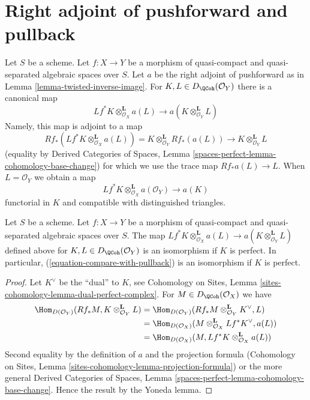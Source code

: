 \section{Right adjoint of pushforward and pullback}
\label{section-compare-with-pullback}

\noindent
Let $S$ be a scheme.
Let $f : X \to Y$ be a morphism of quasi-compact and quasi-separated
algebraic spaces over $S$.
Let $a$ be the right adjoint of pushforward as in
Lemma \ref{lemma-twisted-inverse-image}. For $K, L \in D_\QCoh(\mathcal{O}_Y)$
there is a canonical map
$$
Lf^*K \otimes^\mathbf{L}_{\mathcal{O}_X} a(L)
\longrightarrow
a(K \otimes_{\mathcal{O}_Y}^\mathbf{L} L)
$$
Namely, this map is adjoint to a map
$$
Rf_*(Lf^*K \otimes^\mathbf{L}_{\mathcal{O}_X} a(L)) =
K \otimes^\mathbf{L}_{\mathcal{O}_Y} Rf_*(a(L))
\longrightarrow
K \otimes^\mathbf{L}_{\mathcal{O}_Y} L
$$
(equality by Derived Categories of Spaces, Lemma
\ref{spaces-perfect-lemma-cohomology-base-change})
for which we use the trace map $Rf_*a(L) \to L$.
When $L = \mathcal{O}_Y$ we obtain a map
\begin{equation}
\label{equation-compare-with-pullback}
Lf^*K \otimes^\mathbf{L}_{\mathcal{O}_X} a(\mathcal{O}_Y) \longrightarrow a(K)
\end{equation}
functorial in $K$ and compatible with distinguished triangles.

\begin{lemma}
\label{lemma-compare-with-pullback-perfect}
Let $S$ be a scheme.
Let $f : X \to Y$ be a morphism of quasi-compact and quasi-separated
algebraic spaces over $S$. The map
$Lf^*K \otimes^\mathbf{L}_{\mathcal{O}_X} a(L) \to
a(K \otimes_{\mathcal{O}_Y}^\mathbf{L} L)$
defined above for $K, L \in D_\QCoh(\mathcal{O}_Y)$
is an isomorphism if $K$ is perfect. In particular,
(\ref{equation-compare-with-pullback}) is an isomorphism if $K$ is perfect.
\end{lemma}

\begin{proof}
Let $K^\vee$ be the ``dual'' to $K$, see
Cohomology on Sites, Lemma \ref{sites-cohomology-lemma-dual-perfect-complex}.
For $M \in D_\QCoh(\mathcal{O}_X)$ we have
\begin{align*}
\Hom_{D(\mathcal{O}_Y)}(Rf_*M, K \otimes^\mathbf{L}_{\mathcal{O}_Y} L)
& =
\Hom_{D(\mathcal{O}_Y)}(
Rf_*M \otimes^\mathbf{L}_{\mathcal{O}_Y} K^\vee, L) \\
& =
\Hom_{D(\mathcal{O}_X)}(
M \otimes^\mathbf{L}_{\mathcal{O}_X} Lf^*K^\vee, a(L)) \\
& =
\Hom_{D(\mathcal{O}_X)}(M,
Lf^*K \otimes^\mathbf{L}_{\mathcal{O}_X} a(L))
\end{align*}
Second equality by the definition of $a$ and the projection formula
(Cohomology on Sites, Lemma
\ref{sites-cohomology-lemma-projection-formula})
or the more general Derived Categories of Spaces, Lemma
\ref{spaces-perfect-lemma-cohomology-base-change}.
Hence the result by the Yoneda lemma.
\end{proof}

